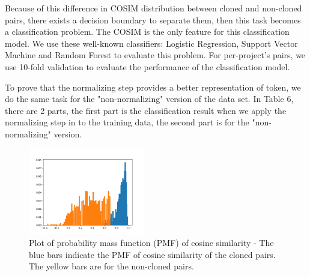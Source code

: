 Because of this difference in COSIM distribution between cloned and non-cloned pairs, there exists a decision boundary to separate them, then this task becomes a classification problem. The COSIM is the only feature for this classification model. We use these well-known classifiers: Logistic Regression, Support Vector Machine and Random Forest to evaluate this problem. For per-project's pairs, we use 10-fold validation to evaluate the performance of the classification model.

To prove that the normalizing step provides a better representation of token, we do the same task for the "non-normalizing" version of the data set. In Table 6, there are 2 parts, the first part is the classification result when we apply the normalizing step in to the training data, the second part is for the "non-normalizing" version.


\begin{figure}[t!]
	\includegraphics[width=0.45\textwidth]{clone_distribution}
	\caption{Plot of probability mass function (PMF) of cosine similarity - The blue bars indicate the PMF of cosine similarity of the cloned pairs. The yellow bars are for the non-cloned pairs.}
	\label{fig:clf}
\end{figure}


